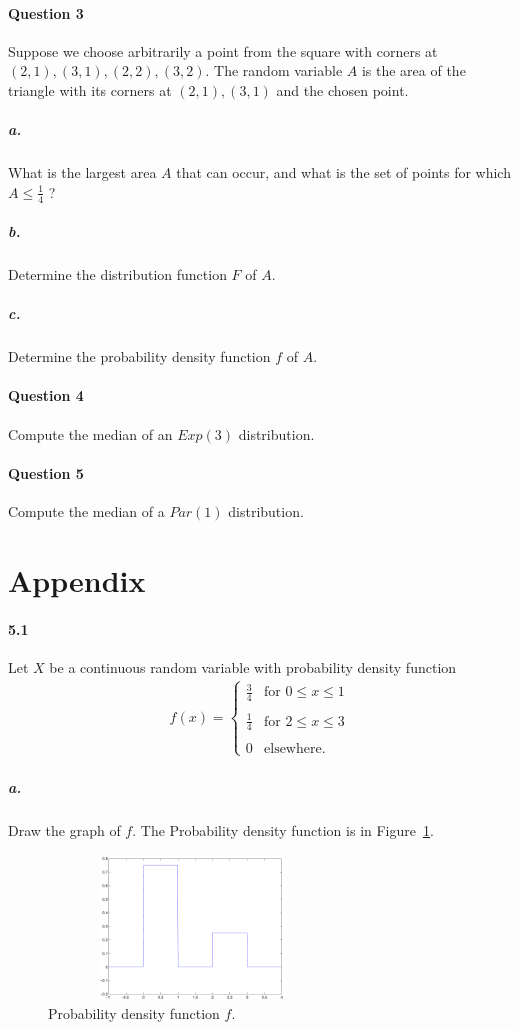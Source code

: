 \documentclass[11pt]{article} %
\begin{document}
\paragraph*{\bf Question 3}Suppose we choose arbitrarily a point from the square with corners at $(2, 1), (3, 1), (2, 2), (3, 2)$. The random variable $A$ is the area of the triangle with its corners at $(2, 1), (3, 1)$ and the chosen point. 

\subparagraph*{a.} What is the largest area $A$ that can occur, and what is the set of points for which $A \leq \frac{1}{4}$ ?
\subparagraph*{b.} Determine the distribution function $F$ of $A$. 
\subparagraph*{c.} Determine the probability density function $f$ of $A$.
\paragraph*{\bf Question 4}
Compute the median of an $Exp(3)$ distribution. 
\paragraph*{\bf Question 5}
 Compute the median of a $Par(1)$ distribution. 
\newpage

\section*{\bf Appendix}
\paragraph*{5.1} Let $X$ be a continuous random variable with probability density function\\
\begin{align*}
f(x) = \left\lbrace
\begin{array}{ll} 
\frac{3}{4} & \text{for } 0 \leq x \leq 1 \\
& \\
\frac{1}{4} & \text{for } 2 \leq x \leq 3 \\ 
& \\
0 & \text{elsewhere.}
\end{array}
\right.
\end{align*}

\subparagraph*{a.} Draw the graph of $f$.
The Probability density function is in Figure~\ref{Fig:ch0501a}.
\begin{figure}[h!]
\centering
\includegraphics[width=3in, height=1.5in]{ch0501a}
\caption{Probability density function $f$.}
\label{Fig:ch0501a}
\end{figure}
\end{document}
